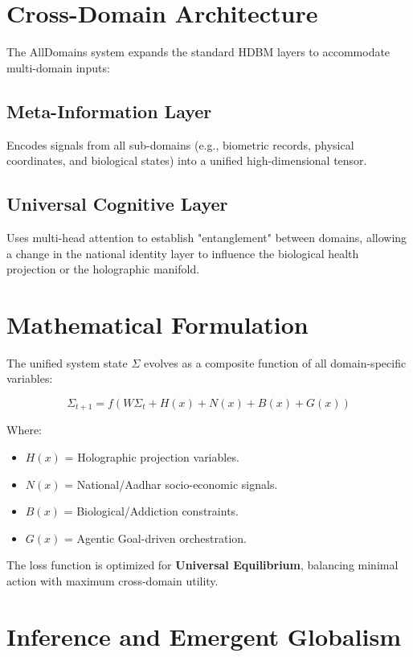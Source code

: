 \documentclass[12pt]{article}
\begin{document}
\section{Cross-Domain Architecture}

The AllDomains system expands the standard HDBM layers to accommodate multi-domain inputs:

\subsection{Meta-Information Layer}
Encodes signals from all sub-domains (e.g., biometric records, physical coordinates, and biological states) into a unified high-dimensional tensor.

\subsection{Universal Cognitive Layer}
Uses multi-head attention to establish "entanglement" between domains, allowing a change in the national identity layer to influence the biological health projection or the holographic manifold.

\section{Mathematical Formulation}

The unified system state $\Sigma$ evolves as a composite function of all domain-specific variables:

\[
\Sigma_{t+1} = f(W\Sigma_t + H(x) + N(x) + B(x) + G(x))
\]

Where:
\begin{itemize}
\item $H(x)$ = Holographic projection variables.
\item $N(x)$ = National/Aadhar socio-economic signals.
\item $B(x)$ = Biological/Addiction constraints.
\item $G(x)$ = Agentic Goal-driven orchestration.
\end{itemize}

The loss function is optimized for \textbf{Universal Equilibrium}, balancing minimal action with maximum cross-domain utility.

\section{Inference and Emergent Globalism}
\end{document}
